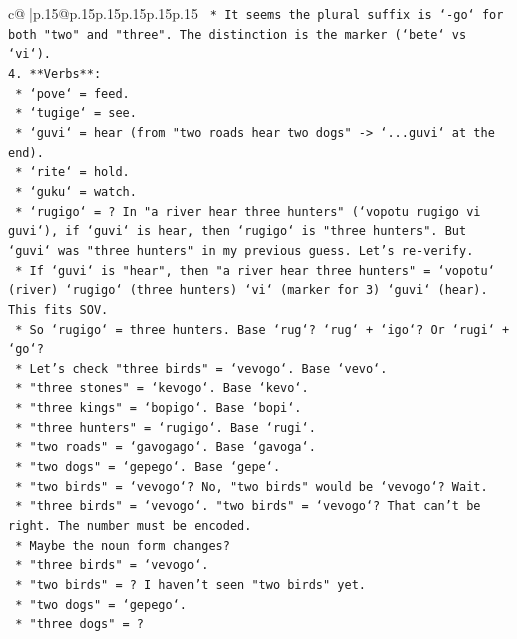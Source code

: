 \documentclass{article}
\begin{document}
{\begin{supertabular}{c@{$\;$}|p{.15\linewidth}@{}p{.15\linewidth}p{.15\linewidth}p{.15\linewidth}p{.15\linewidth}p{.15\linewidth}}
{{{\texttt{    *   It seems the plural suffix is `{-}go` for both "two" and "three". The distinction is the marker (`bete` vs `vi`).} \\
\texttt{4.  **Verbs**:} \\
\texttt{    *   `pove` = feed.} \\
\texttt{    *   `tugige` = see.} \\
\texttt{    *   `guvi` = hear (from "two roads hear two dogs" {-}> `...guvi` at the end).} \\
\texttt{    *   `rite` = hold.} \\
\texttt{    *   `guku` = watch.} \\
\texttt{    *   `rugigo` = ? In "a river hear three hunters" (`vopotu rugigo vi guvi`), if `guvi` is hear, then `rugigo` is "three hunters". But `guvi` was "three hunters" in my previous guess. Let's re{-}verify.} \\
\texttt{    *   If `guvi` is "hear", then "a river hear three hunters" = `vopotu` (river) `rugigo` (three hunters) `vi` (marker for 3) `guvi` (hear). This fits SOV.} \\
\texttt{    *   So `rugigo` = three hunters. Base `rug`? `rug` + `igo`? Or `rugi` + `go`?} \\
\texttt{    *   Let's check "three birds" = `vevogo`. Base `vevo`.} \\
\texttt{    *   "three stones" = `kevogo`. Base `kevo`.} \\
\texttt{    *   "three kings" = `bopigo`. Base `bopi`.} \\
\texttt{    *   "three hunters" = `rugigo`. Base `rugi`.} \\
\texttt{    *   "two roads" = `gavogago`. Base `gavoga`.} \\
\texttt{    *   "two dogs" = `gepego`. Base `gepe`.} \\
\texttt{    *   "two birds" = `vevogo`? No, "two birds" would be `vevogo`? Wait.} \\
\texttt{    *   "three birds" = `vevogo`. "two birds" = `vevogo`? That can't be right. The number must be encoded.} \\
\texttt{    *   Maybe the noun form changes?} \\
\texttt{    *   "three birds" = `vevogo`.} \\
\texttt{    *   "two birds" = ? I haven't seen "two birds" yet.} \\
\texttt{    *   "two dogs" = `gepego`.} \\
\texttt{    *   "three dogs" = ?} \\
}}}
\end{supertabular}}
\end{document}
